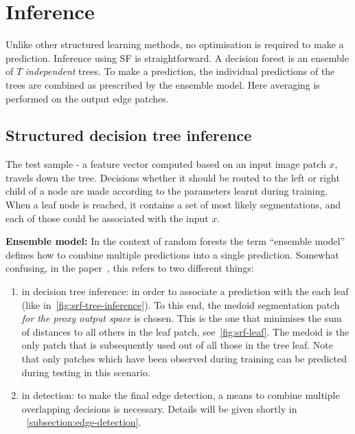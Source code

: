\section{Inference}
Unlike other structured learning methods, no optimisation is required to make a prediction. Inference using SF is straightforward. A decision forest is an ensemble of $T$ \textit{independent} trees. To make a prediction, the individual predictions of the trees are combined as prescribed by the ensemble model. Here averaging is performed on the output edge patches.

\subsection{Structured decision tree inference}
The test sample - a feature vector computed based on an input image patch $x$, travels down the tree. Decisions whether it should be routed to the left or right child of a node are made according to the parameters learnt during training. When a leaf node is reached, it contains a set of most likely segmentations, and each of those could be associated with the input $x$.

\textbf{Ensemble model:} In the context of random forests the term ``ensemble model'' defines how to combine multiple predictions into a single prediction. Somewhat confusing, in the paper~\cite{DollarICCV13edges}, this refers to two different things:
\begin{enumerate}
 \item{in decision tree inference:} in order to associate a prediction with the each leaf (like in~\ref{fig:srf-tree-inference}). To this end, the medoid segmentation patch \textit{for the proxy output space} is chosen. This is the one that minimises the sum of distances to all others in the leaf patch, see~\ref{fig:srf-leaf}. The medoid is the only patch that is subsequently used out of all those in the tree leaf. Note that only patches which have been observed during training can be predicted during testing %
 in this scenario.
 \item{in detection:} to make the final edge detection, a means to combine multiple overlapping decisions is necessary. Details will be given shortly in \textsection~\ref{subsection:edge-detection}.
\end{enumerate}

